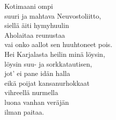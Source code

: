 
            Kotimaani ompi \\
            suuri ja mahtava Neuvostoliitto, \\
            siellä äiti hymyhuulin \\
            Aholaitaa reunustaa \\
            vai onko aallot sen huuhtoneet pois. \\
            Hei Karjalasta heilin minä löysin, \\
            löysin suu- ja sorkkatautisen, \\
            jot' ei pane idän halla \\
            eikä poijat kansanurhokkaat \\
            vihreellä nurmella \\
            luona vanhan veräjän \\
            ilman paitaa. \\
